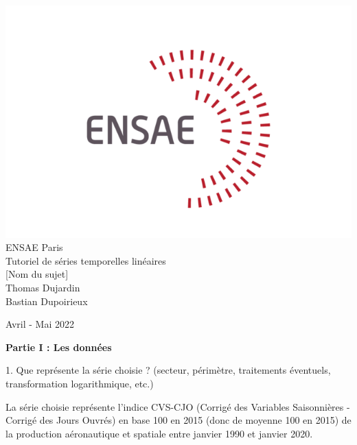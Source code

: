 \documentclass[a4paper, 12pt]{article} %
\begin{document}
\renewcommand*\contentsname{Sommaire}

\begin{titlepage}

\centering

	\includegraphics[scale = 0.5]{logo.png} 
	\\
		\vspace{1 cm}
	\LARGE{ENSAE Paris}
		\\ 
		\vspace{2 cm}
	\Large{Tutoriel de séries temporelles linéaires}
		\\
		\vspace{2.5 cm}
	\Huge{[Nom du sujet]}
		\\
		\vspace{2 cm}
	\Large{Thomas Dujardin}
	\\
	\vspace{1cm}
	\Large{Bastian Dupoirieux}

	\vfill
	{\large{Avril - Mai 2022}}

\end{titlepage}
\newpage

\Large{\textbf{Partie I : Les données}}
\begin{tcolorbox}
{\normalsize
1. Que représente la série choisie ? (secteur, périmètre, traitements éventuels, transformation logarithmique, etc.)}
\end{tcolorbox}
{\small
{La série choisie représente l'indice CVS-CJO (Corrigé des Variables Saisonnières - Corrigé des Jours Ouvrés) en base 100 en 2015 (donc de moyenne 100 en 2015) de la production aéronautique et spatiale entre janvier 1990 et janvier 2020.}}
\end{document}
